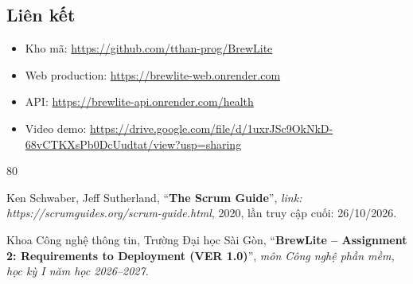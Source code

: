 \documentclass[a4paper]{article}
\begin{document}
\subsection{Liên kết}\label{app:khac2}
\begin{itemize}\raggedright\setlength{\itemsep}{0pt}
\item Kho mã: \url{https://github.com/tthan-prog/BrewLite}
\item Web production: \url{https://brewlite-web.onrender.com}
\item API: \url{https://brewlite-api.onrender.com/health}
\item Video demo: \url{https://drive.google.com/file/d/1uxrJSc9OkNkD-68vCTKXsPb0DcUudtat/view?usp=sharing}
\end{itemize}

\clearpage
\begin{thebibliography}{80}

Ken Schwaber, Jeff Sutherland,
``\textbf{The Scrum Guide}'',
\textit{link: https://scrumguides.org/scrum-guide.html}, 2020, lần truy cập cuối: 26/10/2026.

Khoa Công nghệ thông tin, Trường Đại học Sài Gòn,
``\textbf{BrewLite -- Assignment 2: Requirements to Deployment (VER 1.0)}'',
\textit{môn Công nghệ phần mềm, học kỳ I năm học 2026--2027}.

\end{thebibliography}
\end{document}
